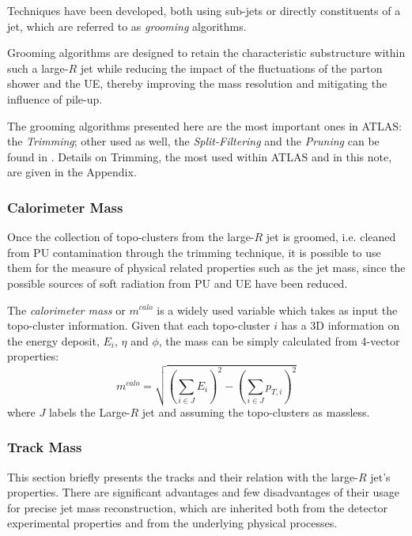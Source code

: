 Techniques have been developed, both using sub-jets or directly constituents of a jet, which are referred to as \textit{grooming} algorithms.

Grooming algorithms are designed to retain the characteristic substructure within such a large-$R$
jet while reducing the impact of the fluctuations of the parton shower and the UE, thereby
improving the mass resolution and mitigating the influence of pile-up.

The grooming algorithms presented here are the most important ones in ATLAS: the \textit{Trimming}; other used as well, the \textit{Split-Filtering} and the \textit{Pruning} can be found in \cite{substructure1}. Details on Trimming, the most used within ATLAS and in this note, are given in the Appendix.


\subsubsection{Calorimeter Mass}

Once the collection of topo-clusters from the large-$R$ jet is groomed, i.e. cleaned from PU contamination through the trimming technique, it is possible to use them for the measure of physical related properties such as the jet mass, since the possible sources of soft radiation from PU and UE have been reduced.


The \textit{calorimeter mass} or $m^{calo}$ is a widely used variable which takes as input the topo-cluster information. Given that each topo-cluster $i$ has a 3D information on the energy deposit, $E_i$, $\eta$ and $\phi$, the mass can be simply calculated from 4-vector properties:
$$m^{calo}=\sqrt{\left(\sum_{i\in J}E_i\right)^2-\left(\sum_{i\in J}p_{T,i}\right)^2} $$
where $J$ labels the Large-$R$ jet and assuming the topo-clusters as massless.

\subsubsection{Track Mass}
\label{sec:tracks}
This section briefly presents the tracks and their relation with the large-$R$ jet's properties.
There are significant advantages and few disadvantages of their usage for precise jet mass reconstruction, which are inherited both from the detector experimental properties and from the underlying physical processes. 

